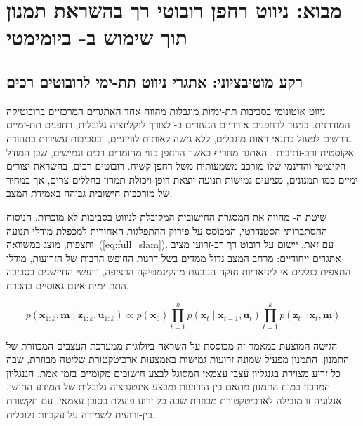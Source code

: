 

\section{מבוא: ניווט רחפן רובוטי רך בהשראת תמנון תוך שימוש ב- ביומימטי}
\label{sec:intro}

\subsection{רקע מוטיבציוני: אתגרי ניווט תת-ימי לרובוטים רכים}
\label{sec:intro_motivation}

ניווט אוטונומי בסביבות תת-ימיות מוגבלות מהווה אחד האתגרים המרכזיים ברובוטיקה המודרנית. בניגוד לרחפנים אוויריים הנעזרים ב- לצורך לוקליזציה גלובלית, רחפנים תת-ימיים נדרשים לפעול בתנאי ראות מוגבלים, ללא גישה לאותות לווייניים, ובסביבות עשירות בתהודה אקוסטית ורב-נתיבית \cite{Thrun2005}. האתגר מחריף כאשר הרחפן בנוי מחומרים רכים וגמישים, שכן המודל הקינמטי והדינמי שלו מורכב משמעותית משל רחפן קשיח. רובוטים רכים, בהשראת יצורים ימיים כמו תמנונים, מציעים גמישות תנועה יוצאת דופן ויכולת תמרון בחללים צרים, אך במחיר של מורכבות חישובית גבוהה באמידת המצב.

שיטת ה- מהווה את המסגרת החישובית המקובלת לניווט בסביבות לא מוכרות. הניסוח ההסתברותי הסטנדרטי, המבוסס על פירוק ההתפלגות האחורית למכפלת מודלי תנועה ותצפית, מוצג במשוואה~(\ref{eq:full_slam}). עם זאת, יישום  על רובוט רך רב-זרועי מציב אתגרים ייחודיים: מרחב המצב גדול ממדים בשל דרגות החופש הרבות של הזרועות, מודלי התצפית כוללים אי-ליניאריות חזקה הנובעת מהקינמטיקה הרציפה, ורעשי החיישנים בסביבה התת-ימית אינם גאוסיים בהכרח.

\begin{equation}
p(\mathbf{x}_{1:k}, \mathbf{m} \mid \mathbf{z}_{1:k}, \mathbf{u}_{1:k}) \propto p(\mathbf{x}_0) \prod_{t=1}^{k} p(\mathbf{x}_t \mid \mathbf{x}_{t-1}, \mathbf{u}_t) \prod_{t=1}^{k} p(\mathbf{z}_t \mid \mathbf{x}_t, \mathbf{m})
\label{eq:full_slam}
\end{equation}

הגישה המוצעת במאמר זה מבוססת על השראה ביולוגית ממערכת העצבים המבוזרת של התמנון. התמנון מפעיל שמונה זרועות גמישות באמצעות ארכיטקטורת שליטה מבוזרת, שבה כל זרוע מצוידת בגנגליון עצבי עצמאי המסוגל לבצע חישובים מקומיים בזמן אמת. הגנגליון המרכזי במוח התמנון מתאם בין הזרועות ומבצע אינטגרציה גלובלית של המידע החושי. אנלוגיה זו מובילה לארכיטקטורת  מבוזרת שבה כל זרוע פועלת כסוכן  עצמאי, עם תקשורת בין-זרועית לשמירה על עקביות גלובלית.

